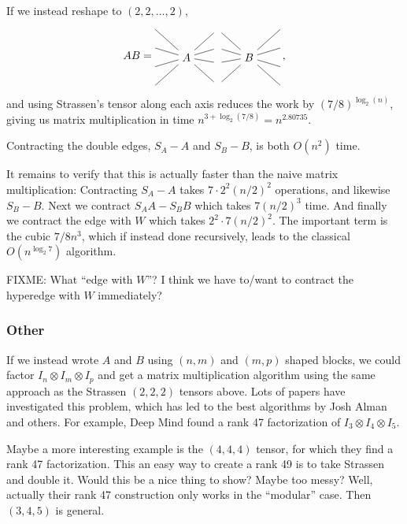 \documentclass[oneside]{book}
\begin{document}
If we instead reshape to $(2,2,\dots,2)$,
\[
AB = 
   \begin{tikzpicture}[baseline=-1em, y=1.7em]
      \node (P1) at (0,-.5) {$A$};
      \node (A) at (1,1) {};
      \node (P2) at (2,-.5) {$B$};
      \node (B) at (1,0) {};
      \node (C) at (1,-.8) {};
      \node (D) at (1,-2) {};
      \draw (-1,1) -- (P1) -- (A) -- (P2) -- (3, 1);
      \draw (-1,0) -- (P1) -- (B) -- (P2) -- (3, 0);
      \draw (-1,-1) -- (P1) -- (C) -- (P2) -- (3, -1);
      \draw (-1,-2) -- (P1) -- (D) -- (P2) -- (3, -2);
   \end{tikzpicture}
   \,,
\]
and using Strassen's tensor along each axis reduces the work by $(7/8)^{\log_2(n)}$, giving us matrix multiplication in time $n^{3 + \log_2(7/8)} = n^{2.80735}$.


\newpage

Contracting the double edges, $S_A - A$ and $S_B - B$, is both $O(n^2)$ time.

It remains to verify that this is actually faster than the naive matrix multiplication:
Contracting $S_A - A$ takes $7\cdot 2^2 (n/2)^2$ operations, and likewise $S_B - B$.
Next we contract $S_AA - S_BB$ which takes $7(n/2)^3$ time.
And finally we contract the edge with $W$ which takes $2^2 \cdot 7 (n/2)^2$.
The important term is the cubic $7/8 n^3$, which if instead done recursively, leads to the classical $O(n^{\log_2 7})$ algorithm.

FIXME: What ``edge with $W$''? I think we have to/want to contract the hyperedge with $W$ immediately?

\subsubsection{Other}

If we instead wrote $A$ and $B$ using $(n,m)$ and $(m,p)$ shaped blocks, we could factor $I_n\otimes I_m\otimes I_p$ and get a matrix multiplication algorithm using the same approach as the Strassen $(2,2,2)$ tensors above.
Lots of papers have investigated this problem, which has led to the best algorithms by Josh Alman and others.
For example, Deep Mind found a rank 47 factorization of $I_3\otimes I_4\otimes I_5$.

Maybe a more interesting example is the $(4,4,4)$ tensor, for which they find a rank 47 factorization.
This an easy way to create a rank 49 is to take Strassen and double it.
Would this be a nice thing to show? Maybe too messy?
Well, actually their rank 47 construction only works in the ``modular'' case. Then $(3,4,5)$ is general.
\end{document}
